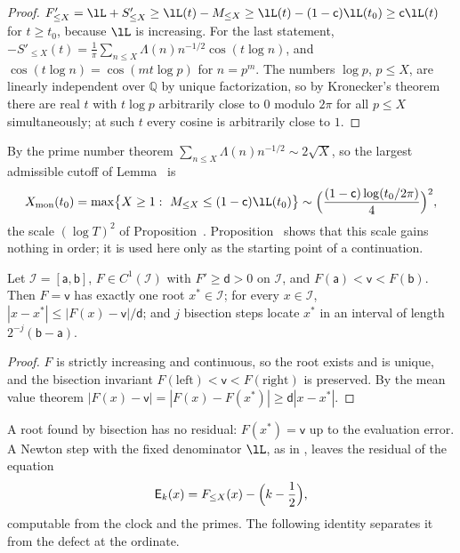 \begin{proof}
$F_{\le X}'=\lL+S'_{\le X}\ge\lL(t)-M_{\le X}\ge\lL(t)-(1-\mathsf c)\lL(t_0)\ge\mathsf c\lL(t)$ for $t\ge t_0$, because $\lL$ is increasing. For the last statement, $-S'_{\le X}(t)=\frac1\pi\sum_{n\le X}\Lambda(n)n^{-1/2}\cos(t\log n)$, and $\cos(t\log n)=\cos(mt\log p)$ for $n=p^m$. The numbers $\log p$, $p\le X$, are linearly independent over $\mathbb Q$ by unique factorization, so by Kronecker's theorem \cite[Ch.~XXIII]{HardyWright2008} there are real $t$ with $t\log p$ arbitrarily close to $0$ modulo $2\pi$ for all $p\le X$ simultaneously; at such $t$ every cosine is arbitrarily close to $1$.
\end{proof}

By the prime number theorem $\sum_{n\le X}\Lambda(n)n^{-1/2}\sim2\sqrt X$, so the largest admissible cutoff of Lemma~ is
\begin{equation}
X_{\rm mon}(t_0)=\max\bigl\{X\ge1:\ M_{\le X}\le(1-\mathsf c)\lL(t_0)\bigr\}\sim\Bigl(\frac{(1-\mathsf c)\log(t_0/2\pi)}4\Bigr)^2 ,
\label{eq:Xmon}
\end{equation}
the scale $(\log T)^2$ of Proposition~. Proposition~ shows that this scale gains nothing in order; it is used here only as the starting point of a continuation.

\begin{lemma}\label{lem:certified_root}
Let $\mathscr I=[\mathsf a,\mathsf b]$, $F\in C^1(\mathscr I)$ with $F'\ge\mathsf d>0$ on $\mathscr I$, and $F(\mathsf a)<\mathsf v<F(\mathsf b)$. Then $F=\mathsf v$ has exactly one root $x^*\in\mathscr I$; for every $x\in\mathscr I$, $|x-x^*|\le|F(x)-\mathsf v|/\mathsf d$; and $j$ bisection steps locate $x^*$ in an interval of length $2^{-j}(\mathsf b-\mathsf a)$.
\end{lemma}

\begin{proof}
$F$ is strictly increasing and continuous, so the root exists and is unique, and the bisection invariant $F(\text{left})<\mathsf v<F(\text{right})$ is preserved. By the mean value theorem $|F(x)-\mathsf v|=|F(x)-F(x^*)|\ge\mathsf d|x-x^*|$.
\end{proof}

A root found by bisection has no residual: $F(x^*)=\mathsf v$ up to the evaluation error. A Newton step with the fixed denominator $\lL$, as in , leaves the residual of the equation
\begin{equation}
\mathsf E_k(x)=F_{\le X}(x)-\Bigl(k-\frac12\Bigr),
\label{eq:equation_residual}
\end{equation}
computable from the clock and the primes. The following identity separates it from the defect at the ordinate.

